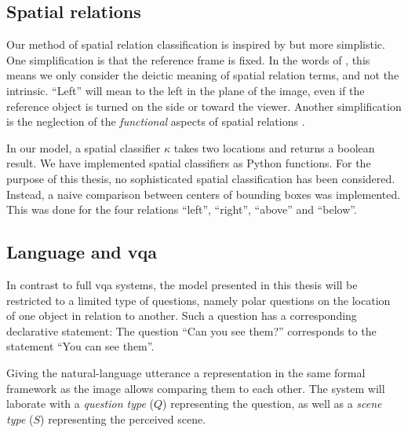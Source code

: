 \subsection{Spatial relations}
\label{sec:method-spatrel}

Our method of spatial relation classification is inspired by \cite{ttrspat} but more simplistic.
One simplification is that the reference frame is fixed.
In the words of \cite{Garnhamunifiedtheorymeaning1989}, this means we only consider the deictic meaning of spatial relation terms, and not the intrinsic.
``Left'' will mean to the left in the plane of the image, even if the reference object is turned on the side or toward the viewer.
Another simplification is the neglection of the \textit{functional} aspects of spatial relations \citep{CoventryInterplayGeometryFunction2001}.

In our model, a spatial classifier $\kappa$ takes two locations and returns a boolean result.
We have implemented spatial classifiers as Python functions.
For the purpose of this thesis, no sophisticated spatial classification has been considered.
Instead, a naive comparison between centers of bounding boxes was implemented.
This was done for the four relations ``left'', ``right'', ``above'' and ``below''.



\subsection{Language and \gls{vqa}}
\label{sec:languagevqa}

In contrast to full \gls{vqa} systems, the model presented in this thesis will be restricted to a limited type of questions, namely polar questions on the location of one object in relation to another.
Such a question has a corresponding declarative statement:
The question ``Can you see them?'' corresponds to the statement ``You can see them''.

Giving the natural-language utterance a representation in the same formal framework as the image allows comparing them to each other.
The system will laborate with a \textit{question type} ($Q$) representing the question, as well as a \textit{scene type} ($S$) representing the perceived scene.

